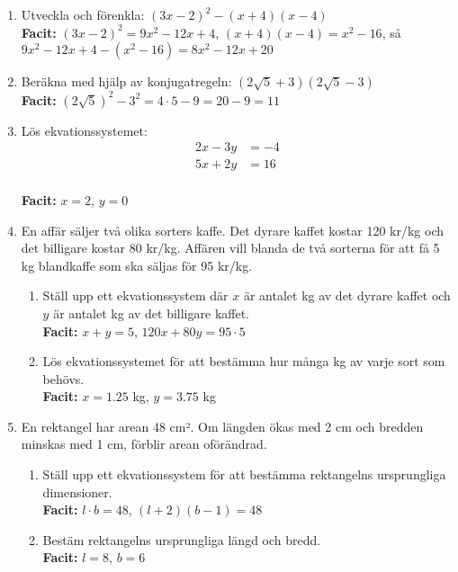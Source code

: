 \documentclass[a4paper,11pt]{article}
\begin{document}
\begin{enumerate}[label=\textbf{\arabic*.}]
    \item Utveckla och förenkla: $(3x - 2)^2 - (x + 4)(x - 4)$
    \\ \textbf{Facit:} $(3x-2)^2 = 9x^2 - 12x + 4$, $(x+4)(x-4) = x^2 - 16$, så $9x^2 - 12x + 4 - (x^2 - 16) = 8x^2 - 12x + 20$
    
    \item Beräkna med hjälp av konjugatregeln: $(2\sqrt{5} + 3)(2\sqrt{5} - 3)$
    \\ \textbf{Facit:} $(2\sqrt{5})^2 - 3^2 = 4\cdot5 - 9 = 20 - 9 = 11$
    
    \item Lös ekvationssystemet:
    \begin{align*}
    2x - 3y &= -4\\
    5x + 2y &= 16
    \end{align*}
    \\ \textbf{Facit:} $x=2$, $y=0$
    
    \item En affär säljer två olika sorters kaffe. Det dyrare kaffet kostar 120 kr/kg och det billigare kostar 80 kr/kg. Affären vill blanda de två sorterna för att få 5 kg blandkaffe som ska säljas för 95 kr/kg.
    \begin{enumerate}[label=\alph*)]
        \item Ställ upp ett ekvationssystem där $x$ är antalet kg av det dyrare kaffet och $y$ är antalet kg av det billigare kaffet.
        \\ \textbf{Facit:} $x + y = 5$, $120x + 80y = 95 \cdot 5$
        \item Lös ekvationssystemet för att bestämma hur många kg av varje sort som behövs.
        \\ \textbf{Facit:} $x=1.25$ kg, $y=3.75$ kg
    \end{enumerate}
    
    \item En rektangel har arean 48 cm². Om längden ökas med 2 cm och bredden minskas med 1 cm, förblir arean oförändrad.
    \begin{enumerate}[label=\alph*)]
        \item Ställ upp ett ekvationssystem för att bestämma rektangelns ursprungliga dimensioner.
        \\ \textbf{Facit:} $l\cdot b = 48$, $(l+2)(b-1)=48$
        \item Bestäm rektangelns ursprungliga längd och bredd.
        \\ \textbf{Facit:} $l=8$, $b=6$
    \end{enumerate}
    

\end{enumerate}
\end{document}
